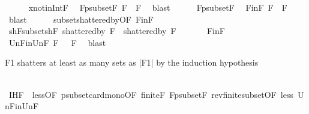\begin{isabellebody}
\ \ \ \ \isamarkupfalse%
\ x{\isacharunderscore}{\kern0pt}not{\isacharunderscore}{\kern0pt}in{\isacharunderscore}{\kern0pt}Int{\isacharunderscore}{\kern0pt}F\ \isamarkupfalse%
\ F{}{\isacharunderscore}{\kern0pt}psubset{\isacharunderscore}{\kern0pt}F{\isacharcolon}{\kern0pt}\ {\isachardoublequoteopen}{\isacharquery}{\kern0pt}F{}\ {\isasymsubset}\ F{\isachardoublequoteclose}\ \isamarkupfalse%
\ blast\isanewline
\ \ \ \ \isamarkupfalse%
\ F{}{\isacharunderscore}{\kern0pt}psubset{\isacharunderscore}{\kern0pt}F\ \isamarkupfalse%
\ F{}{\isacharunderscore}{\kern0pt}in{\isacharunderscore}{\kern0pt}F{\isacharcolon}{\kern0pt}\ {\isachardoublequoteopen}{\isacharquery}{\kern0pt}F{}\ {\isasymsubseteq}\ F{\isachardoublequoteclose}\ \isamarkupfalse%
\ blast\isanewline
\ \ \ \ \isamarkupfalse%
\ subset{\isacharunderscore}{\kern0pt}shattered{\isacharunderscore}{\kern0pt}by{\isacharbrackleft}{\kern0pt}OF\ F{}{\isacharunderscore}{\kern0pt}in{\isacharunderscore}{\kern0pt}F{\isacharbrackright}{\kern0pt}\ \isamarkupfalse%
\ shF{}{\isacharunderscore}{\kern0pt}subset{\isacharunderscore}{\kern0pt}shF{\isacharcolon}{\kern0pt}\ {\isachardoublequoteopen}shattered{\isacharunderscore}{\kern0pt}by\ {\isacharquery}{\kern0pt}F{}\ {\isasymsubseteq}\ shattered{\isacharunderscore}{\kern0pt}by\ F{\isachardoublequoteclose}\ \isacommand{{\isachardot}{\kern0pt}}\isamarkupfalse%
\isanewline
\ \ \ \ \isamarkupfalse%
\ F{}{\isacharunderscore}{\kern0pt}in{\isacharunderscore}{\kern0pt}F\ \isamarkupfalse%
\ Un{\isacharunderscore}{\kern0pt}F{}{\isacharunderscore}{\kern0pt}in{\isacharunderscore}{\kern0pt}Un{\isacharunderscore}{\kern0pt}F{\isacharcolon}{\kern0pt}{\isachardoublequoteopen}{\isasymUnion}\ {\isacharquery}{\kern0pt}F{}\ {\isasymsubseteq}\ {\isasymUnion}\ F{\isachardoublequoteclose}\ \isamarkupfalse%
\ blast%
\begin{isamarkuptext}%
F1 shatters at least as many sets as |F1| by the induction hypothesis%
\end{isamarkuptext}\isamarkuptrue%
\ \ \ \ \isamarkupfalse%
\ IH{\isacharunderscore}{\kern0pt}F{}\ {\isacharequal}{\kern0pt}\ less{\isacharparenleft}{\kern0pt}{}{\isacharparenright}{\kern0pt}{\isacharbrackleft}{\kern0pt}OF\ psubset{\isacharunderscore}{\kern0pt}card{\isacharunderscore}{\kern0pt}mono{\isacharbrackleft}{\kern0pt}OF\ finite{\isacharunderscore}{\kern0pt}F\ F{}{\isacharunderscore}{\kern0pt}psubset{\isacharunderscore}{\kern0pt}F{\isacharbrackright}{\kern0pt}\ rev{\isacharunderscore}{\kern0pt}finite{\isacharunderscore}{\kern0pt}subset{\isacharbrackleft}{\kern0pt}OF\ less{\isacharparenleft}{\kern0pt}{}{\isacharparenright}{\kern0pt}\ Un{\isacharunderscore}{\kern0pt}F{}{\isacharunderscore}{\kern0pt}in{\isacharunderscore}{\kern0pt}Un{\isacharunderscore}{\kern0pt}F{\isacharbrackright}{\kern0pt}{\isacharbrackright}{\kern0pt}\isanewline

\end{isabellebody}
